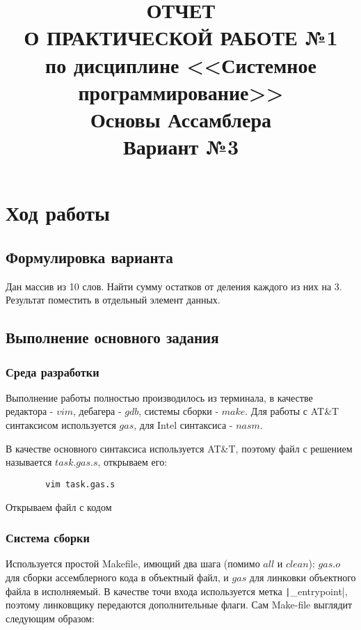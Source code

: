 \documentclass[a4paper]{article}
\title{
  ОТЧЕТ \\
  О ПРАКТИЧЕСКОЙ РАБОТЕ №1 \\
  по дисциплине <<Системное программирование>> \\
  Основы Ассамблера \\
  Вариант №3
}
\begin{document}
  \templatedtitlepage
  
  \toc

  \section{Ход работы}

  \subsection{Формулировка варианта}

  Дан массив из 10 слов. Найти сумму остатков от деления каждого из них на 3.
  Результат поместить в отдельный элемент данных.
  
  \subsection{Выполнение основного задания}

  \subsubsection{Среда разработки}

  Выполнение работы полностью производилось из терминала,
  в качестве редактора - $vim$, дебагера - $gdb$, системы
  сборки - $make$. Для работы с AT\&T синтаксисом используется
  $gas$, для Intel синтаксиса - $nasm$.

  В качестве основного синтаксиса используется AT\&T, поэтому
  файл с решением называется $task.gas.s$, открываем его:

  \begin{listing}[H]
    \begin{verbatim}
        vim task.gas.s
    \end{verbatim}
    \caption{Открываем файл с кодом}
  \end{listing}

  \subsubsection{Система сборки}

  Используется простой Makefile, имющий два шага (помимо $all$ и $clean$):
  $gas.o$ для сборки ассемблерного кода в объектный файл, и 
  $gas$ для линковки объектного файла в исполняемый.
  В качестве точи входа используется метка \texttt|_entrypoint|,
  поэтому линковщику передаются дополнительные флаги. Сам Make-file
  выглядит следующим образом:
\end{document}
